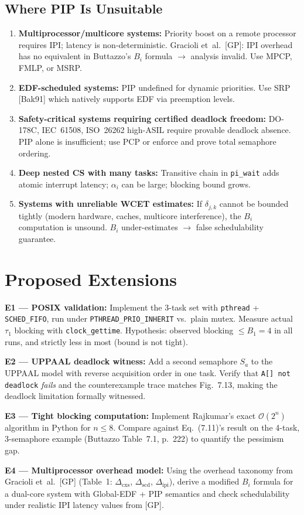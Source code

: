 \documentclass[conference,onecolumn]{IEEEtran}
\begin{document}
\subsection{Where PIP Is Unsuitable}

\begin{enumerate}
  \item \textbf{Multiprocessor/multicore systems:} Priority boost on
        a remote processor requires IPI; latency is non-deterministic.
        Gracioli et~al.~[GP]: IPI overhead has no equivalent in
        Buttazzo's $B_i$ formula $\to$ analysis invalid.
        Use MPCP, FMLP, or MSRP.
  \item \textbf{EDF-scheduled systems:} PIP undefined for dynamic priorities.
        Use SRP [Bak91] which natively supports EDF via preemption levels.
  \item \textbf{Safety-critical systems requiring certified deadlock freedom:}
        DO-178C, IEC~61508, ISO~26262 high-ASIL require
        provable deadlock absence. PIP alone is insufficient; use PCP
        or enforce and prove total semaphore ordering.
  \item \textbf{Deep nested CS with many tasks:} Transitive chain in
        \texttt{pi\_wait} adds atomic interrupt latency; $\alpha_i$ can
        be large; blocking bound grows.
  \item \textbf{Systems with unreliable WCET estimates:} If $\delta_{j,k}$
        cannot be bounded tightly (modern hardware, caches, multicore
        interference), the $B_i$ computation is unsound.
        $B_i$ under-estimates $\to$ false schedulability guarantee.
\end{enumerate}

\section{Proposed Extensions}

\textbf{E1 --- POSIX validation:}
Implement the 3-task set with \texttt{pthread} + \texttt{SCHED\_FIFO},
run under \texttt{PTHREAD\_PRIO\_INHERIT} vs.\ plain mutex.
Measure actual $\tau_1$ blocking with \texttt{clock\_gettime}.
Hypothesis: observed blocking $\leq B_1 = 4$ in all runs,
and strictly less in most (bound is not tight).

\textbf{E2 --- UPPAAL deadlock witness:}
Add a second semaphore $S_a$ to the UPPAAL model with reverse
acquisition order in one task. Verify that \texttt{A[] not deadlock}
\emph{fails} and the counterexample trace matches Fig.~7.13,
making the deadlock limitation formally witnessed.

\textbf{E3 --- Tight blocking computation:}
Implement Rajkumar's exact $\mathcal{O}(2^n)$ algorithm in Python
for $n \leq 8$. Compare against Eq.~(7.11)'s result on the
4-task, 3-semaphore example (Buttazzo Table~7.1, p.~222)
to quantify the pessimism gap.

\textbf{E4 --- Multiprocessor overhead model:}
Using the overhead taxonomy from Gracioli et~al.~[GP] (Table~1:
$\Delta_\mathrm{cxs}$, $\Delta_\mathrm{scd}$, $\Delta_\mathrm{ipi}$),
derive a modified $B_i$ formula for a dual-core system with
Global-EDF + PIP semantics and check schedulability under
realistic IPI latency values from [GP].
\end{document}

